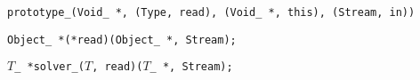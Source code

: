 
\tt{prototype_(Void_ *, (Type, read), (Void_ *, this), (Stream, in))}


\tt{Object_ *(*read)(Object_ *, Stream);}


$T$\tt{_ *solver_(}$T$\tt{, read)(}$T$\tt{_ *, Stream);}

